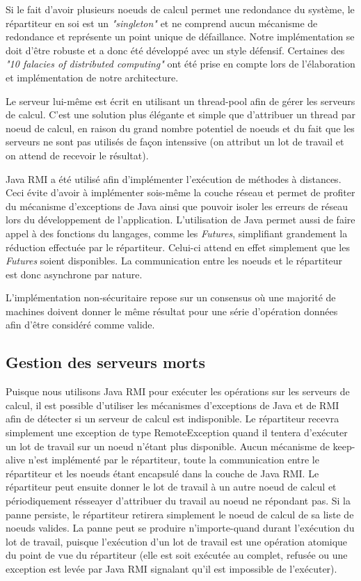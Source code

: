 Si le fait d'avoir plusieurs noeuds de calcul permet une redondance du système, le répartiteur en soi est un \emph{"singleton"} et 
ne comprend aucun mécanisme de redondance et représente un point unique de défaillance. Notre implémentation se doit d'être robuste et 
a donc été développé avec un style défensif. Certaines des \emph{"10 falacies of distributed computing"} ont été prise en compte lors de l'élaboration et implémentation
de notre architecture. 

Le serveur lui-même est écrit en utilisant un thread-pool afin de gérer les serveurs de calcul. C'est une solution plus élégante et simple que 
d'attribuer un thread par noeud de calcul, en raison du grand nombre potentiel de noeuds et du fait que les serveurs ne sont pas utilisés de façon intenssive 
(on attribut un lot de travail et on attend de recevoir le résultat). 

Java RMI a été utilisé afin d'implémenter l'exécution de méthodes à distances. Ceci évite d'avoir à implémenter sois-même la couche réseau et permet
de profiter du mécanisme d'exceptions de Java ainsi que pouvoir isoler les erreurs de réseau lors du développement de l'application. L'utilisation 
de Java permet aussi de faire appel à des fonctions du langages, comme les \emph{Futures}, simplifiant grandement la réduction effectuée par le répartiteur. Celui-ci
attend en effet simplement que les \emph{Futures} soient disponibles. La communication entre les noeuds et le répartiteur est donc asynchrone par nature.  

L'implémentation non-sécuritaire repose sur un consensus où une majorité de machines doivent donner le même résultat pour une série d'opération données 
afin d'être considéré comme valide. 

\subsection{Gestion des serveurs morts}
Puisque nous utilisons Java RMI pour exécuter les opérations sur les serveurs de calcul, il est possible d'utiliser les mécanismes d'exceptions de Java et 
de RMI afin de détecter si un serveur de calcul est indisponible. Le répartiteur recevra simplement une exception de type RemoteException
quand il tentera d'exécuter un lot de travail sur un noeud n'étant plus disponible. Aucun mécanisme de keep-alive n'est implémenté par le répartiteur, toute la communication 
entre le répartiteur et les noeuds étant encapsulé dans la couche de Java RMI. Le répartiteur peut ensuite donner le lot de travail à un autre noeud de calcul et périodiquement 
résseayer d'attribuer du travail au noeud ne répondant pas. Si la panne persiste, le répartiteur retirera simplement le noeud de calcul de sa liste de noeuds valides. La panne peut se
produire n'importe-quand durant l'exécution du lot de travail, puisque l'exécution d'un lot de travail est une opération atomique du point de vue du répartiteur (elle est soit exécutée au complet, 
refusée ou une exception est levée par Java RMI signalant qu'il est impossible de l'exécuter). 

